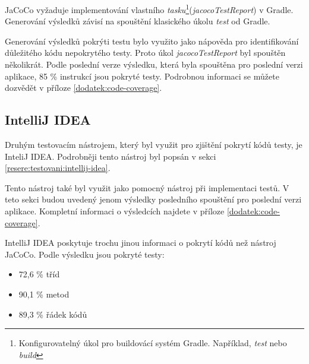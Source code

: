     JaCoCo vyžaduje implementování vlastního \textit{tasku}\footnote{Konfigurovatelný úkol pro buildovácí systém Gradle. Například, \textit{test} nebo \textit{build}}(\textit{jacocoTestReport}) v Gradle. Generování výsledků závisí na spouštění klasického úkolu \textit{test} od Gradle. 
    
    Generování výsledků pokrýti testu bylo využito jako nápověda pro identifikování důležitého kódu nepokrytého testy. Proto úkol \textit{jacocoTestReport} byl spouštěn několikrát. Podle poslední verze výsledku, která byla spouštěna pro poslední verzi aplikace, 85 \% instrukcí jsou pokryté testy. Podrobnou informaci se můžete dozvědět v příloze \ref{dodatek:code-coverage}.
    \subsection{IntelliJ IDEA}
    Druhým testovacím nástrojem, který byl využit pro zjištění pokrytí kódů testy, je InteliJ IDEA. Podrobněji tento nástroj byl popsán v sekci \ref{resere:testovani:intellij-idea}. 
    
    Tento nástroj také byl využit jako pomocný nástroj při implementaci testů. V teto sekci budou uvedený jenom výsledky posledního spouštění pro poslední verzi aplikace. Kompletní informaci o výsledcích najdete v příloze \ref{dodatek:code-coverage}.
    
    IntelliJ IDEA poskytuje trochu jinou informaci o pokrytí kódů než nástroj JaCoCo. Podle výsledku jsou pokryté testy:
    \begin{itemize}
            \item 72,6 \% tříd
            \item 90,1 \% metod
            \item 89,3 \% řádek kódů
    \end{itemize}
    